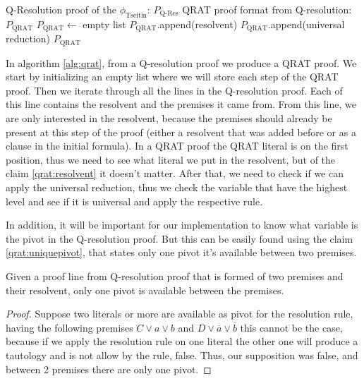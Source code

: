 \begin{algorithm}[H]
\caption{Q-Resolution to QRAT proof format.}\label{alg:qrat}
\begin{algorithmic}[1]
\Require Q-Resolution proof of the $\phi_\text{Tseitin}$: $P_\text{Q-Res}$
\Ensure QRAT proof format from Q-resolution: $P_\text{QRAT}$
\State $P_\text{QRAT} \gets$ empty list
    \State $P_\text{QRAT}.$append(resolvent)
    \State $P_\text{QRAT}.$append(universal reduction)
    \EndWhile
\EndFor
\State \Return $P_\text{QRAT}$
\EndProcedure
\end{algorithmic}
\end{algorithm}

In algorithm \ref{alg:qrat}, from a Q-resolution proof we produce a QRAT proof. We start by initializing an empty list where we will store each step of the QRAT proof. Then we iterate through all the lines in the Q-resolution proof. Each of this line contains the resolvent and the premises it came from. From this line, we are only interested in the resolvent, because the premises should already be present at this step of the proof (either a resolvent that was added before or as a clause in the initial formula). In a QRAT proof the QRAT literal is on the first position, thus we need to see what literal we put in the resolvent, but of the claim \ref{qrat:resolvent} it doesn't matter. After that, we need to check if we can apply the universal reduction, thus we check the variable that have the highest level and see if it is universal and apply the respective rule.

In addition, it will be important for our implementation to know what variable is the pivot in the Q-resolution proof. But this can be easily found using the claim \ref{qrat:uniquepivot}, that states only one pivot it's available between two premises.

\begin{claim}\label{qrat:uniquepivot}
    Given a proof line from Q-resolution proof that is formed of two premises and their resolvent, only one pivot is available between the premises.
\end{claim}

\begin{proof}
    Suppose two literals or more are available as pivot for the resolution rule, having the following premises $C \lor a \lor b$ and $D \lor \overline{a} \lor \overline{b}$ this cannot be the case, because if we apply the resolution rule on one literal the other one will produce a tautology and is not allow by the rule, false. Thus, our supposition was false, and between 2 premises there are only one pivot.
\end{proof}

